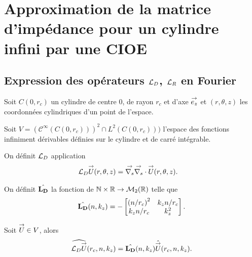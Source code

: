 \section{Approximation de la matrice d'impédance pour un cylindre infini par une CIOE}

  \subsection[Expression des opérateurs LD, LR en Fourier]{Expression des opérateurs \({\mathcal{L}_D}\), \({\mathcal{L}_R}\) en Fourier}
    Soit \(C(0,r_c)\) un cylindre de centre 0, de rayon \(r_c\) et d'axe \({\overset{\rightarrow}{e_z}}\) et \((r,\theta,z)\) les coordonnées cylindriques d'un point de l'espace.

    Soit \(V = \left(\mathcal{C}^\infty(C(0,r_c))\right)^2 \cap L^2(C(0,r_c)))\) l'espace des fonctions infiniment dérivables définies sur le cylindre et de carré intégrable.

    \begin{defn}
      \label{eq:cylindre:fourier:LD}
      On définit \({\mathcal{L}_D}\) application
      \begin{align*}
        {\mathcal{L}_D} {\overset{\rightarrow}{U}}(r,\theta,z) & = {\overset{\rightarrow}{\nabla_s}}{} {\overset{\rightarrow}{\nabla_s}} \cdot{} {\overset{\rightarrow}{U}}(r,\theta,z).
      \end{align*}

      On définit \(\hat{\mathbf{L_D}}\) la fonction de \(\mathbb N\times\mathbb R \rightarrow \mathcal{M}_2(\mathbb R)\) telle que
      \begin{equation*}
        \hat{\mathbf{L_D}}(n,k_z) = -
        \begin{bmatrix}
          \left({n}\slash{r_c}\right)^2 & k_z{n}\slash{r_c}
          \\
          k_z{n}\slash{r_c} & k_z^2
        \end{bmatrix}.
      \end{equation*}
    \end{defn}

    \begin{prop}
      Soit \({\overset{\rightarrow}{U}} \in V\), alors
      \begin{equation*}
        \widehat{{\mathcal{L}_D} {\overset{\rightarrow}{U}}} (r_c,n,k_z) = \hat{\mathbf{L_D}}(n,k_z) \hat{{\overset{\rightarrow}{U}}}(r_c,n,k_z).
      \end{equation*}
    \end{prop}

